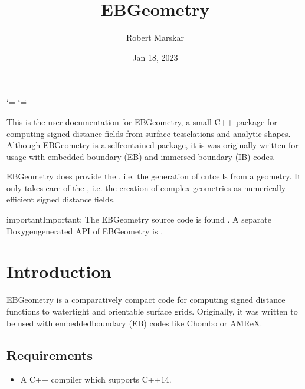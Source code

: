\documentclass[letterpaper,10pt,english]{sphinxmanual}
\title{EBGeometry}
\date{Jan 18, 2023}
\author{Robert Marskar}
\begin{document}
\ifdefined\shorthandoff
  \ifnum\catcode`\=\string=\active\shorthandoff{=}\fi
  \ifnum\catcode`\"=\active{}\fi
\fi

\pagestyle{empty}
\sphinxmaketitle
\pagestyle{plain}
\sphinxtableofcontents
\pagestyle{normal}
\label{\detokenize{index::doc}}


\sphinxAtStartPar
This is the user documentation for EBGeometry, a small C++ package for computing signed distance fields from surface tesselations and analytic shapes.
Although EBGeometry is a self\sphinxhyphen{}contained package, it is was originally written for usage with embedded boundary (EB) and immersed boundary (IB) codes.

\sphinxAtStartPar
EBGeometry does provide the , i.e. the generation of cut\sphinxhyphen{}cells from a geometry.
It only takes care of the , i.e. the creation of complex geometries as numerically efficient signed distance fields.

\begin{sphinxadmonition}{important}{Important:}
\sphinxAtStartPar
The EBGeometry source code is found .
A separate Doxygen\sphinxhyphen{}generated API of EBGeometry is .
\end{sphinxadmonition}




\chapter{Introduction}
\label{\detokenize{index:introduction}}
\sphinxstepscope
{}\label{\detokenize{Introduction:chap-introduction}}
\sphinxAtStartPar
EBGeometry is a comparatively compact code for computing signed distance functions to watertight and orientable surface grids.
Originally, it was written to be used with embedded\sphinxhyphen{}boundary (EB) codes like Chombo or AMReX.


\section{Requirements}
\label{\detokenize{Introduction:requirements}}\label{\detokenize{Introduction::doc}}\begin{itemize}
\item {} 
\sphinxAtStartPar
A C++ compiler which supports C++14.

\end{itemize}
\end{document}
